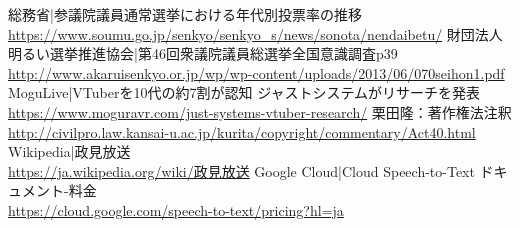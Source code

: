 \documentclass[a4paper,12pt]{jsarticle}
\begin{document}
\begin{thebibliography}{99}
	 総務省|参議院議員通常選挙における年代別投票率の推移 \\\url{https://www.soumu.go.jp/senkyo/senkyo_s/news/sonota/nendaibetu/}
	 財団法人明るい選挙推進協会|第46回衆議院議員総選挙全国意識調査p39\\\url{http://www.akaruisenkyo.or.jp/wp/wp-content/uploads/2013/06/070seihon1.pdf}
	 MoguLive|VTuberを10代の約7割が認知 ジャストシステムがリサーチを発表	\\\url{https://www.moguravr.com/just-systems-vtuber-research/}
	 栗田隆：著作権法注釈\\\url{http://civilpro.law.kansai-u.ac.jp/kurita/copyright/commentary/Act40.html}
	 Wikipedia|政見放送 \\\url{https://ja.wikipedia.org/wiki/政見放送}
	 Google Cloud|Cloud Speech-to-Text ドキュメント-料金 \\\url{https://cloud.google.com/speech-to-text/pricing?hl=ja}

\end{thebibliography}
\end{document}
